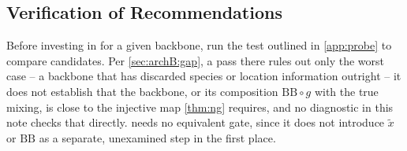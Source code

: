 \subsection{Verification of Recommendations}
\label{sec:verify}
Before investing in  for a given backbone, run the test outlined in \cref{app:probe}
to compare candidates. Per \cref{sec:archB:gap}, a pass there rules out only the worst case -- a
backbone that has discarded species or location information outright -- it does not establish that the
backbone, or its composition $\mathrm{BB}\circ g$ with the true mixing, is close to the injective map \cref{thm:ng} requires, and no diagnostic in this note checks that directly.  needs no equivalent gate, since it does not introduce $\tilde x$ or $\mathrm{BB}$ as a separate, unexamined step in the first place.
